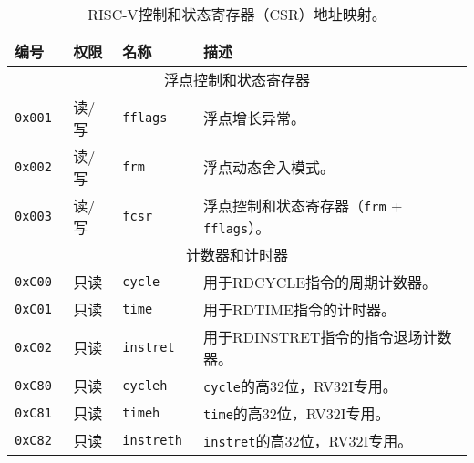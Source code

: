 \begin{table}[htb!]
\begin{center}
\begin{tabular}{|l|l|l|l|}
\hline
编号   & 权限 & 名称 & 描述 \\
\hline
\multicolumn{4}{|c|}{浮点控制和状态寄存器} \\
\hline
\tt 0x001 & 读/写  &\tt fflags     & 浮点增长异常。 \\
\tt 0x002 & 读/写  &\tt frm        & 浮点动态舍入模式。 \\
\tt 0x003 & 读/写  &\tt fcsr       & 浮点控制和状态寄存器（{\tt frm} + {\tt fflags}）。 \\
\hline
\multicolumn{4}{|c|}{计数器和计时器} \\
\hline
\tt 0xC00 & 只读  &\tt cycle      & 用于RDCYCLE指令的周期计数器。\\
\tt 0xC01 & 只读  &\tt time       & 用于RDTIME指令的计时器。 \\
\tt 0xC02 & 只读  &\tt instret    & 用于RDINSTRET指令的指令退场计数器。\\
\tt 0xC80 & 只读  &\tt cycleh     & {\tt cycle}的高32位，RV32I专用。 \\
\tt 0xC81 & 只读  &\tt timeh      & {\tt time}的高32位，RV32I专用。 \\
\tt 0xC82 & 只读  &\tt instreth   & {\tt instret}的高32位，RV32I专用。 \\
\hline
\end{tabular}
\end{center}
\caption{RISC-V控制和状态寄存器（CSR）地址映射。}
\label{rvgcsrnames}
\end{table}

